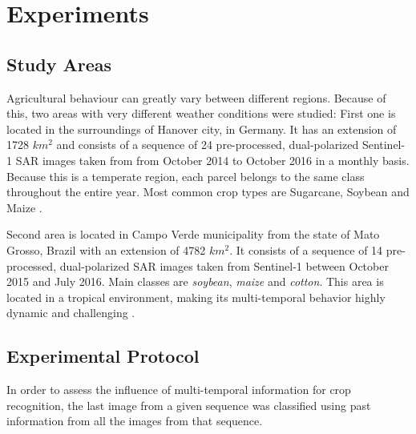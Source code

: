 \section{Experiments}


\subsection{Study Areas}

Agricultural behaviour can greatly vary between different regions. Because of this, two areas with very different weather conditions were studied: First one is located in the surroundings of Hanover city, in Germany. It has an extension of 1728 $km^2$ and consists of a sequence of 24 pre-processed, dual-polarized Sentinel-1 SAR images taken from from October 2014 to October 2016 in a monthly basis. Because this is a temperate region, each parcel belongs to the same class throughout the entire year. Most common crop types are Sugarcane, Soybean and Maize \cite{bargiel2017new}.

Second area is located in Campo Verde municipality from the state of Mato Grosso, Brazil with an extension of 4782 $km^2$. It consists of a sequence of 14 pre-processed, dual-polarized SAR images taken from Sentinel-1 between October 2015 and July 2016. Main classes are \textit{soybean}, \textit{maize} and \textit{cotton}. This area is located in a tropical environment, making its multi-temporal behavior highly dynamic and challenging \cite{sanches2018campo}.

\subsection{Experimental Protocol}

In order to assess the influence of multi-temporal information for crop recognition, the last image from a given sequence was classified using past information from all the images from that sequence.

